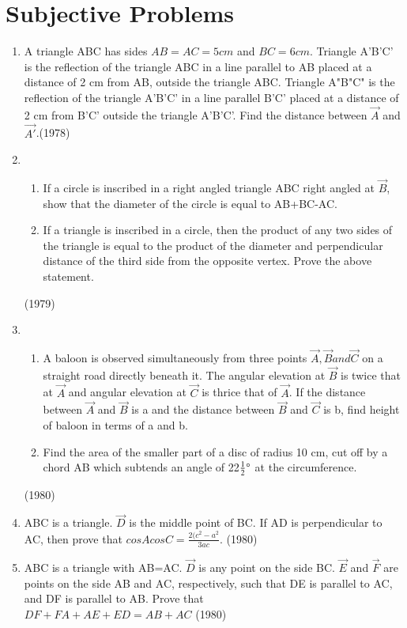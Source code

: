 \documentclass[journal,12pt,twocolumn]{IEEEtran}
\theoremstyle{remark}
\begin{document}
\section{Subjective Problems}

\begin{enumerate}
     \item A triangle ABC has sides $AB=AC=5 cm$ and $BC =6 cm$. Triangle A'B'C' is the reflection of the triangle ABC in a line parallel to AB placed at a distance of 2 cm from AB, outside the triangle ABC. Triangle A"B"C" is the reflection of the triangle A'B'C' in a line parallel B'C' placed at a distance of 2 cm from B'C' outside the triangle A'B'C'. Find the distance between $\vec{A}$ and $\vec{A'}$.\hfill {(1978)}
    \item 
    \begin{enumerate}
	    \item If a circle is inscribed in a right angled triangle ABC right angled at $\vec{B}$, show that the diameter of the circle is equal to AB+BC-AC.
    \item If a triangle is inscribed in a circle, then the product of any two sides of the triangle is equal to the product of the diameter and perpendicular distance of the third side from the opposite vertex. Prove the above statement.
    \end{enumerate}
    \hfill {(1979)}
    \item
    \begin{enumerate}
	    \item A baloon is observed simultaneously from three points $\vec{A},\vec{B} and \vec{C}$ on a straight road directly beneath it. The angular elevation at $\vec{B}$ is twice that at $\vec{A}$ and angular elevation at $\vec{C}$ is thrice that of $\vec{A}$. If the distance between $\vec{A}$ and $\vec{B}$ is a and the distance between $\vec{B}$ and $\vec{C}$ is b, find height of baloon in terms of a and b.
    \item Find the area of the smaller part of a disc of radius 10 cm, cut off by a chord AB which subtends an angle of 22$\frac{1}{2} \degree$ at the circumference.
    \end{enumerate}
    \hfill {(1980)}
    \item ABC is a triangle. $\vec{D}$ is the middle point of BC. If AD is perpendicular to AC, then prove that $cosAcosC = \frac{2(c^{2}-a^{2}}{3ac}$.
    \hfill {(1980)}
    \item ABC is a triangle with AB=AC. $\vec{D}$ is any point on the side BC. $\vec{E}$ and $\vec{F}$ are points on the side AB and AC, respectively, such that DE is parallel to AC, and DF is parallel to AB. Prove that \\
    $DF + FA + AE + ED = AB+AC$
    \hfill {(1980)} 
\end{enumerate}
\end{document}
